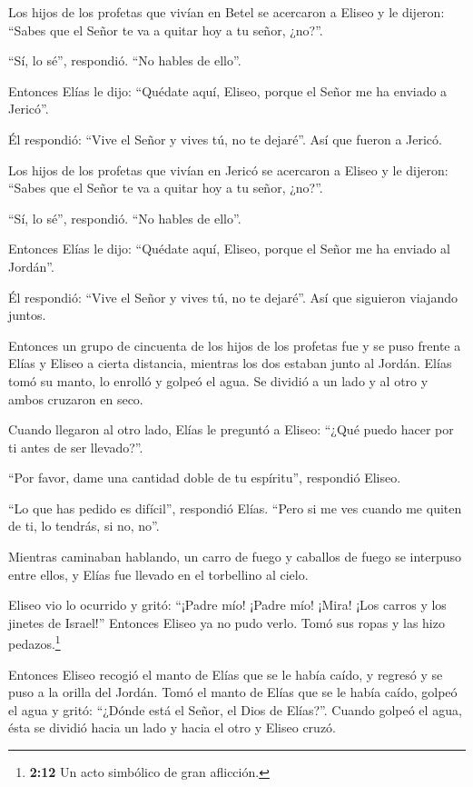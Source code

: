  Los hijos de los profetas que vivían en Betel se acercaron
a Eliseo y le dijeron: ``Sabes que el Señor te va a quitar hoy a tu
señor, ¿no?''.

``Sí, lo sé'', respondió. ``No hables de ello''.

 Entonces Elías le dijo: ``Quédate aquí, Eliseo, porque el
Señor me ha enviado a Jericó''.

Él respondió: ``Vive el Señor y vives tú, no te dejaré''. Así que fueron
a Jericó.

 Los hijos de los profetas que vivían en Jericó se acercaron
a Eliseo y le dijeron: ``Sabes que el Señor te va a quitar hoy a tu
señor, ¿no?''.

``Sí, lo sé'', respondió. ``No hables de ello''.

 Entonces Elías le dijo: ``Quédate aquí, Eliseo, porque el
Señor me ha enviado al Jordán''.

Él respondió: ``Vive el Señor y vives tú, no te dejaré''. Así que
siguieron viajando juntos.

 Entonces un grupo de cincuenta de los hijos de los profetas
fue y se puso frente a Elías y Eliseo a cierta distancia, mientras los
dos estaban junto al Jordán.  Elías tomó su manto, lo
enrolló y golpeó el agua. Se dividió a un lado y al otro y ambos
cruzaron en seco.

 Cuando llegaron al otro lado, Elías le preguntó a Eliseo:
``¿Qué puedo hacer por ti antes de ser llevado?''.

``Por favor, dame una cantidad doble de tu espíritu'', respondió Eliseo.

 ``Lo que has pedido es difícil'', respondió Elías. ``Pero
si me ves cuando me quiten de ti, lo tendrás, si no, no''.

 Mientras caminaban hablando, un carro de fuego y caballos
de fuego se interpuso entre ellos, y Elías fue llevado en el torbellino
al cielo.

 Eliseo vio lo ocurrido y gritó: ``¡Padre mío! ¡Padre mío!
¡Mira! ¡Los carros y los jinetes de Israel!'' Entonces Eliseo ya no pudo
verlo. Tomó sus ropas y las hizo pedazos.\footnote{\textbf{2:12} Un acto
  simbólico de gran aflicción.}

 Entonces Eliseo recogió el manto de Elías que se le había
caído, y regresó y se puso a la orilla del Jordán.  Tomó el
manto de Elías que se le había caído, golpeó el agua y gritó: ``¿Dónde
está el Señor, el Dios de Elías?''. Cuando golpeó el agua, ésta se
dividió hacia un lado y hacia el otro y Eliseo cruzó.

